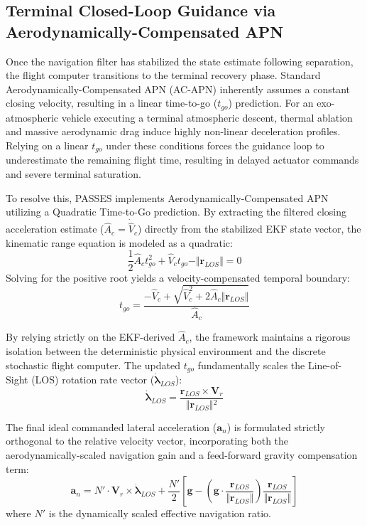 \documentclass[11pt,a4paper]{article}
\theoremstyle{definition}
\numberwithin{equation}{section}
\begin{document}
\subsection{Terminal Closed-Loop Guidance via Aerodynamically-Compensated APN}

Once the navigation filter has stabilized the state estimate following separation, the flight computer transitions to the terminal recovery phase. Standard Aerodynamically-Compensated APN (AC-APN) inherently assumes a constant closing velocity, resulting in a linear time-to-go ($t_{go}$) prediction. For an exo-atmospheric vehicle executing a terminal atmospheric descent, thermal ablation and massive aerodynamic drag induce highly non-linear deceleration profiles. Relying on a linear $t_{go}$ under these conditions forces the guidance loop to underestimate the remaining flight time, resulting in delayed actuator commands and severe terminal saturation.

To resolve this, PASSES implements Aerodynamically-Compensated APN utilizing a Quadratic Time-to-Go prediction. By extracting the filtered closing acceleration estimate ($\hat{A}_c = \dot{\hat{V}}_c$) directly from the stabilized EKF state vector, the kinematic range equation is modeled as a quadratic:
\begin{equation}
    \frac{1}{2}\hat{A}_c t_{go}^2 + \hat{V}_c t_{go} - \Vert{}\mathbf{r}_{LOS}\Vert{} = 0
\end{equation}
Solving for the positive root yields a velocity-compensated temporal boundary:
\begin{equation}
    t_{go} = \frac{-\hat{V}_c + \sqrt{\hat{V}_c^2 + 2 \hat{A}_c \Vert{}\mathbf{r}_{LOS}\Vert{}}}{\hat{A}_c}
\end{equation}

By relying strictly on the EKF-derived $\hat{A}_c$, the framework maintains a rigorous isolation between the deterministic physical environment and the discrete stochastic flight computer. The updated $t_{go}$ fundamentally scales the Line-of-Sight (LOS) rotation rate vector ($\boldsymbol{\dot{\lambda}}_{LOS}$):
\begin{equation}
    \boldsymbol{\dot{\lambda}}_{LOS} = \frac{\mathbf{r}_{LOS} \times \mathbf{V}_r}{\Vert{}\mathbf{r}_{LOS}\Vert{}^2}
\end{equation}

The final ideal commanded lateral acceleration ($\mathbf{a}_n$) is formulated strictly orthogonal to the relative velocity vector, incorporating both the aerodynamically-scaled navigation gain and a feed-forward gravity compensation term:
\begin{equation}
    \mathbf{a}_n = N' \cdot \mathbf{V}_r \times \boldsymbol{\dot{\lambda}}_{LOS} + \frac{N'}{2} \left[ \mathbf{g} - \left(\mathbf{g} \cdot \frac{\mathbf{r}_{LOS}}{\Vert{}\mathbf{r}_{LOS}\Vert{}}\right)\frac{\mathbf{r}_{LOS}}{\Vert{}\mathbf{r}_{LOS}\Vert{}} \right]
\end{equation}
where $N'$ is the dynamically scaled effective navigation ratio.
\end{document}
